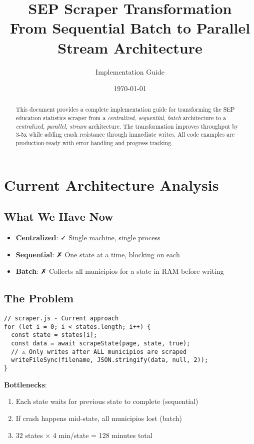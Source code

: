 \documentclass[11pt,a4paper]{article}
\title{\textbf{SEP Scraper Transformation}\\
\large From Sequential Batch to Parallel Stream Architecture}
\author{Implementation Guide}
\date{\today}
\begin{document}
\maketitle

\begin{abstract}
This document provides a complete implementation guide for transforming the SEP education statistics scraper from a \textit{centralized, sequential, batch} architecture to a \textit{centralized, parallel, stream} architecture. The transformation improves throughput by 3-5x while adding crash resistance through immediate writes. All code examples are production-ready with error handling and progress tracking.
\end{abstract}

\section{Current Architecture Analysis}

\subsection{What We Have Now}

\begin{itemize}[leftmargin=*]
    \item \textbf{Centralized}: ✓ Single machine, single process
    \item \textbf{Sequential}: ✗ One state at a time, blocking on each
    \item \textbf{Batch}: ✗ Collects all municipios for a state in RAM before writing
\end{itemize}

\subsection{The Problem}

\begin{lstlisting}[caption={Current Sequential Implementation}]
// scraper.js - Current approach
for (let i = 0; i < states.length; i++) {
  const state = states[i];
  const data = await scrapeState(page, state, true);
  // ⚠️ Only writes after ALL municipios are scraped
  writeFileSync(filename, JSON.stringify(data, null, 2));
}
\end{lstlisting}

\textbf{Bottlenecks}:
\begin{enumerate}
    \item Each state waits for previous state to complete (sequential)
    \item If crash happens mid-state, all municipios lost (batch)
    \item 32 states × 4 min/state = 128 minutes total
\end{enumerate}
\end{document}
